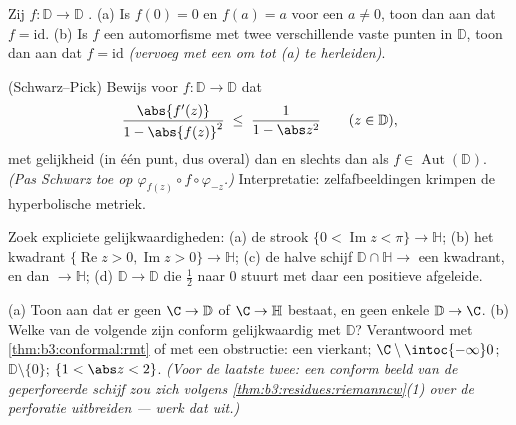 \begin{exercise}[$\star$]\label{exo:b3:conformal:2}
Zij $f \colon \mathbb D \to \mathbb D$ .
(a) Is $f(0) = 0$ en $f(a) = a$ voor een $a \neq 0$, toon dan aan
dat $f = \mathrm{id}$.
(b) Is $f$ een automorfisme met twee verschillende vaste punten
in $\mathbb D$, toon dan aan dat $f = \mathrm{id}$ \emph{(vervoeg
met een  om tot (a) te herleiden)}.
\end{exercise}

\begin{exercise}[$\star\star$]\label{exo:b3:conformal:3}
(Schwarz--Pick) Bewijs voor  $f\colon \mathbb D \to
\mathbb D$ dat
\[
\frac{\abs{f'(z)}}{1 - \abs{f(z)}^2} \;\leq\;
\frac{1}{1 - \abs z^2}
\qquad (z \in \mathbb D),
\]
met gelijkheid (in één punt, dus overal) dan en slechts dan als
$f \in \operatorname{Aut}(\mathbb D)$. \emph{(Pas Schwarz toe op
$\varphi_{f(z)}\circ f\circ\varphi_{-z}$.)} Interpretatie:
 zelfafbeeldingen krimpen de hyperbolische metriek.
\end{exercise}

\begin{exercise}[$\star\star$]\label{exo:b3:conformal:4}
Zoek expliciete  gelijkwaardigheden:
(a) de strook $\{0 < \operatorname{Im}z < \pi\} \to \mathbb H$;
(b) het kwadrant $\{\operatorname{Re}z > 0, \operatorname{Im}z >
0\} \to \mathbb H$;
(c) de halve schijf $\mathbb D\cap\mathbb H \to$ een kwadrant, en
dan $\to \mathbb H$;
(d) $\mathbb D \to \mathbb D$ die $\frac12$ naar $0$ stuurt met
daar een positieve afgeleide.
\end{exercise}

\begin{exercise}[$\star\star$]\label{exo:b3:conformal:5}
(a) Toon aan dat er geen  $\C \to \mathbb D$
of $\C \to \mathbb H$ bestaat, en geen enkele $\mathbb D \to \C$.
(b) Welke van de volgende zijn conform gelijkwaardig met $\mathbb
D$? Verantwoord met \cref{thm:b3:conformal:rmt} of met een
obstructie: een vierkant; $\C\setminus\intoc{-\infty}0$;
$\mathbb D\setminus\{0\}$; $\{1 < \abs z < 2\}$. \emph{(Voor de
laatste twee: een conform beeld van de geperforeerde schijf zou
zich volgens \cref{thm:b3:residues:riemanncw}(1) over de
perforatie uitbreiden --- werk dat uit.)}
\end{exercise}

